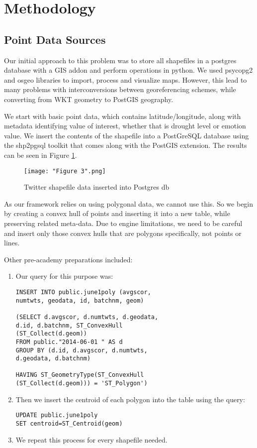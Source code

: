 \documentclass[conference]{IEEEtran}
\begin{document}
\section{Methodology}

\subsection{Point Data Sources}

Our initial approach to this problem was to store all shapefiles in a postgres database with a GIS addon and perform operations in python. We used psycopg2 and osgeo libraries to import, process and visualize maps. However, this lead to many problems with interconversions between georeferencing schemes, while converting from WKT geometry to PostGIS geography.

We start with basic point data, which contains latitude/longitude, along with metadata identifying value of interest, whether that is drought level or emotion value. We insert the contents of the shapefile into a PostGreSQL database using the shp2pgsql toolkit that comes along with the PostGIS extension. The results can be seen in Figure \ref{Figure 3}.

\begin{figure}[ht]
\centerline{\texttt{[image: "Figure 3".png]}}
\caption{Twitter shapefile data inserted into Postgres db}
\label{Figure 3}
\end{figure}

As our framework relies on using polygonal data, we cannot use this. So we begin by creating a convex hull of points and inserting it into a new table, while preserving related meta-data. Due to engine limitations, we need to be careful and insert only those convex hulls that are polygons specifically, not points or lines.

Other pre-academy preparations included:
\begin{enumerate}
	\item Our query for this purpose was:
\begin{lstlisting}
INSERT INTO public.june1poly (avgscor, 
numtwts, geodata, id, batchnm, geom)

(SELECT d.avgscor, d.numtwts, d.geodata, 
d.id, d.batchnm, ST_ConvexHull
(ST_Collect(d.geom))
FROM public."2014-06-01 " AS d
GROUP BY (d.id, d.avgscor, d.numtwts,
d.geodata, d.batchnm)

HAVING ST_GeometryType(ST_ConvexHull
(ST_Collect(d.geom))) = 'ST_Polygon')
\end{lstlisting}
	\item Then we insert the centroid of each polygon into the table using the query:

\begin{lstlisting}
UPDATE public.june1poly 
SET centroid=ST_Centroid(geom)
\end{lstlisting}

	\item We repeat this process for every shapefile needed.
\end{enumerate}
\end{document}
